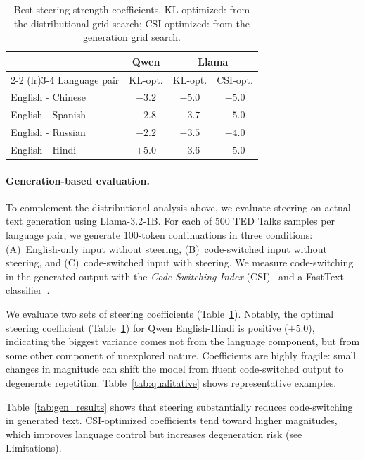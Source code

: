 \begin{table}
  \centering
  \small
  \begin{tabular}{l c c c}
    \hline
    & Qwen & \multicolumn{2}{c}{Llama} \\
    \cmidrule(lr){2-2} \cmidrule(lr){3-4}
    Language pair & KL-opt. & KL-opt. & CSI-opt. \\
    \hline
    English - Chinese & $-3.2$ & $-5.0$ & $-5.0$ \\
    English - Spanish & $-2.8$ & $-3.7$ & $-5.0$ \\
    English - Russian & $-2.2$ & $-3.5$ & $-4.0$ \\
    English - Hindi   & $+5.0$ & $-3.6$ & $-5.0$ \\
    \hline
  \end{tabular}
  \caption{Best steering strength coefficients. KL-optimized: from the distributional grid search; CSI-optimized: from the generation grid search.}
  \label{tab:steering_coeff}
\end{table}

\paragraph{Generation-based evaluation.} To complement the distributional analysis above, we evaluate steering on actual text generation using Llama-3.2-1B.
For each of 500 TED Talks samples per language pair, we generate 100-token continuations in three conditions: (A)~English-only input without steering, (B)~code-switched input without steering, and (C)~code-switched input with steering.
We measure code-switching in the generated output with the \emph{Code-Switching Index} (CSI)~\cite{gamback-das-2016-comparing} and a FastText classifier~\citep{joulin-etal-2017-bag}.

We evaluate two sets of steering coefficients (Table~\ref{tab:steering_coeff}).
Notably, the optimal steering coefficient (Table~\ref{tab:steering_coeff}) for Qwen English-Hindi is positive ($+5.0$), indicating the biggest variance comes not from the language component, but from some other component of unexplored nature.
Coefficients are highly fragile: small changes in magnitude can shift the model from fluent code-switched output to degenerate repetition.
Table~\ref{tab:qualitative} shows representative examples.

Table~\ref{tab:gen_results} shows that steering substantially reduces code-switching in generated text. CSI-optimized coefficients tend toward higher magnitudes, which improves language control but increases degeneration risk (see Limitations).
